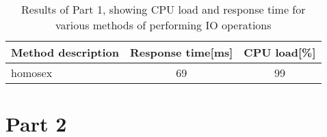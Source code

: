 \documentclass{article}
\begin{document}
\begin{table}[h]
    \caption{Results of Part 1, showing CPU load and response time for various methods of
    performing IO operations}\label{tab:part1-results}
    \begin{center}
        \begin{tabular}[c]{l|c|c}
            \hline
            \multicolumn{1}{c|}{\textbf{Method description}} & 
            \multicolumn{1}{c|}{\textbf{Response time[ms]}} & 
            \multicolumn{1}{c}{\textbf{CPU load[\%]}} \\
            \hline
            homosex & 69 & 99 \\
            \hline
        \end{tabular}
    \end{center}
\end{table}



\section*{Part 2}

\end{document}

